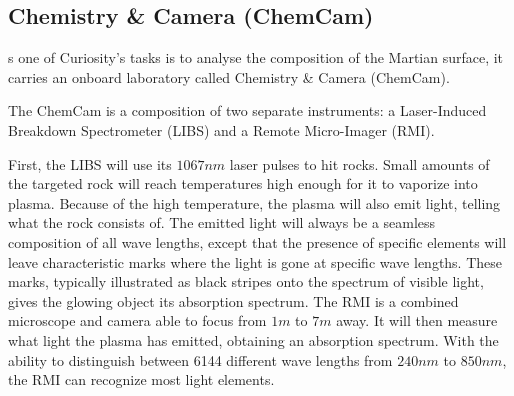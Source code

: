 \subsection{Chemistry \& Camera (ChemCam)}
s one of Curiosity's tasks is to analyse the composition of the Martian surface, it carries an onboard laboratory called Chemistry \& Camera (ChemCam).

The ChemCam is a composition of two separate instruments: a Laser-Induced Breakdown Spectrometer (LIBS) and a Remote Micro-Imager (RMI).

First, the LIBS will use its $1067 nm$ laser pulses to hit rocks.
Small amounts of the targeted rock will reach temperatures high enough for it to vaporize into plasma.
Because of the high temperature, the plasma will also emit light, telling what the rock consists of.
The emitted light will always be a seamless composition of all wave lengths, except that the presence of specific elements will leave characteristic marks where the light is gone at specific wave lengths.
These marks, typically illustrated as black stripes onto the spectrum of visible light, gives the glowing object its absorption spectrum.
The RMI is a combined microscope and camera able to focus from $1 m$ to $7 m$ away.
It will then measure what light the plasma has emitted, obtaining an absorption spectrum.
With the ability to distinguish between 6144 different wave lengths from $240 nm$ to $850 nm$, the RMI can recognize most light elements. \cite{ChemCam}